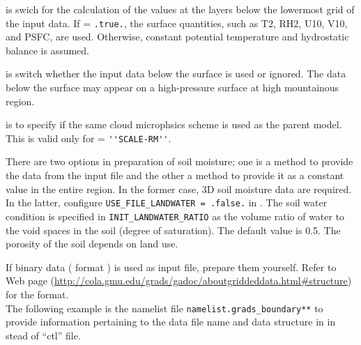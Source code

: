  is swich for the calculation of the values at the layers below the lowermost grid of the input data.
If  = \verb|.true.|, the surface quantities, such as T2, RH2, U10, V10, and PSFC, are used.
Otherwise, constant potential temperature and hydrostatic balance is assumed.

 is switch whether the input data below the surface is used or ignored.
The data below the surface may appear on a high-pressure surface at high mountainous region.

 is to specify if the same cloud microphsics scheme is used as the parent model.
This is valid only for  = \verb|''SCALE-RM''|.


There are two options in preparation of soil moisture; one is a method to provide the data from the input file and the other a method to provide it as a constant value in the entire region.
In the former case, 3D soil moisture data are required.
In the latter, configure \verb|USE_FILE_LANDWATER = .false.| in .
The soil water condition is specified in \verb|INIT_LANDWATER_RATIO| as the volume ratio of water to the void spaces in the soil (degree of saturation).
The default value is 0.5.
The porosity of the soil depends on land use.

If binary data ( \grads format ) is used as input file, prepare them yourself.
Refer to \grads Web page (\url{http://cola.gmu.edu/grads/gadoc/aboutgriddeddata.html#structure}) for the format.\\
The following example is the namelist file \verb|namelist.grads_boundary**| to provide information pertaining to the data file name and data structure in \scalerm in stead of ``ctl'' file.

